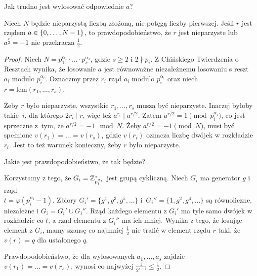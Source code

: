 Jak trudno jest wylosować odpowiednie \( a \)?
\begin{theorem}
    Niech \( N \) będzie nieparzystą liczbą złożoną, nie potęgą liczby pierwszej. Jeśli \( r \) jest rzędem \( a \in \set{0, \ldots, N-1} \), to prawdopodobieństwo,
    że \( r \) jest nieparzyste lub \( a^{\frac{r}{2}} = -1 \) nie przekracza \( \frac{1}{2} \).
\end{theorem}
\begin{proof}
    Niech \( N = p_1^{\alpha_1} \cdot \ldots \cdot p_s^{\alpha_s} \), gdzie \(s \geq 2\) i \( 2 \nmid p_i \).
    Z Chińskiego Twierdzenia o Resztach wynika, że losowanie \(a\) jest równoważne niezależnemu losowaniu s reszt \(a_i\) modulo \(p_i^{\alpha_i}\).
    Oznaczmy przez \(r_i\) rząd \(a_i\) modulo \(p_i^{\alpha_i}\) oraz niech \(r = \text{lcm}(r_1, \ldots, r_s)\).

    Żeby \(r\) było nieparzyste, wszystkie \(r_1, \ldots, r_s\) muszą być nieparzyste. Inaczej byłoby takie~\( i \), dla którego \(2r_i \mid r\), więc też \(a^{r_i} \mid a^{r/2}\).
    Zatem \(a^{r/2} = 1 \pmod{p_i^{\alpha_i}}\), co jest sprzeczne z~tym, że \(a^{r/2} = -1 \mod N\). Żeby \(a^{r/2} = -1 \pmod{N}\), musi być spełnione \(v(r_1) = \ldots = v(r_s)\), gdzie \(v(r_i)\) oznacza liczbę dwójek w rozkładzie \(r_i\).
    Jest to też warunek konieczny, żeby \(r\) było nieparzyste.
    
\newpage
    Jakie jest prawdopodobieństwo, że tak będzie?
    
    Korzystamy z tego, że \(G_i = \mathbb{Z}_{p_i^{\alpha_i}}^*\) jest grupą cykliczną. Niech \( G_i \) ma generator \(g\) i rząd \\ \(t = \varphi(p_i^{\alpha_i} - 1)\). Zbiory \(G_i' = \{g^1, g^3, g^5, \ldots\}\) i~\(G_i'' = \{1, g^2, g^4, \ldots\}\) są równoliczne, niezależne i \(G_i = G_i' \cup G_i''\).
    Rząd każdego elementu z \(G_i'\) ma tyle samo dwójek w rozkładzie co \(t\), a rząd elementu z \(G_i''\) ma ich mniej. Wynika z tego, że losując element z \(G_i\), mamy szansę co najmniej \(\frac{1}{2}\) nie trafić w element rzędu \( r \) taki, że \(v(r) = q\) dla ustalonego \(q\).
    
    Prawdopodobieństwo, że dla wylosowanych \(a_1, \ldots, a_s\) zajdzie \(v(r_1) = \ldots = v(r_s)\), wynosi co najwyżej \(\frac{1}{2^{s-1}} \leq \frac{1}{2}\).
\end{proof}

